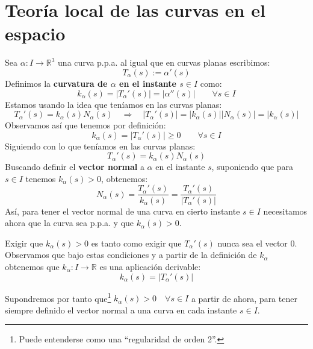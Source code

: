 \section{Teoría local de las curvas en el espacio}
\noindent
Sea $\alpha:I\to \mathbb{R}^3$ una curva p.p.a. al igual que en curvas planas escribimos:
\begin{equation*}
    T_\alpha(s) := \alpha'(s)
\end{equation*}
Definimos la \textbf{curvatura de $\alpha$ en el instante $s\in I$} como:
\begin{equation*}
    k_\alpha(s) = |T_\alpha'(s)| = |\alpha''(s)| \qquad \forall s\in I
\end{equation*}
Estamos usando la idea que teníamos en las curvas planas:
\begin{equation*}
    T_\alpha'(s) = k_\alpha(s)N_\alpha(s) \quad\Longrightarrow\quad |T_\alpha'(s)| = |k_\alpha(s)||N_\alpha(s)| = |k_\alpha(s)|
\end{equation*}
Observamos así que tenemos por definición:
\begin{equation*}
    k_\alpha(s) = |T_\alpha'(s)| \geq 0 \qquad \forall s\in I
\end{equation*}
Siguiendo con lo que teníamos en las curvas planas:
\begin{equation*}
    T_\alpha'(s) = k_\alpha(s) N_\alpha(s)
\end{equation*}
Buscando definir el \textbf{vector normal} a $\alpha$ en el instante $s$, suponiendo que para $s\in I$ tenemos $k_\alpha(s) > 0$, obtenemos:
\begin{equation*}
    N_\alpha(s) = \frac{T_\alpha'(s)}{k_\alpha(s)} = \frac{T_\alpha'(s)}{|T_\alpha'(s)|}
\end{equation*}
Así, para tener el vector normal de una curva en cierto instante $s\in I$ necesitamos ahora que la curva sea p.p.a. y que $k_\alpha(s) > 0$.

\begin{observacion}
    Exigir que $k_\alpha(s)>0$ es tanto como exigir que $T_\alpha'(s)$ nunca sea el vector $0$. Observamos que bajo estas condiciones y a partir de la definición de $k_\alpha$ obtenemos que $k_\alpha:I\to\mathbb{R}$ es una aplicación derivable:
    \begin{equation*}
        k_\alpha(s) = |T_\alpha'(s)|
    \end{equation*}
\end{observacion}

\noindent
Supondremos por tanto que\footnote{Puede entenderse como una ``regularidad de orden 2''.} $k_\alpha(s) > 0 \quad \forall s\in I$ a partir de ahora, para tener siempre definido el vector normal a una curva en cada instante $s\in I$.\\

